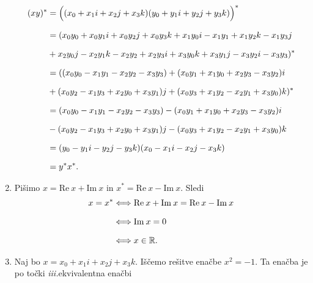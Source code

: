 \documentclass[mat1, tisk]{fmfdelo}
\numberwithin{equation}{section}
\begin{document}
\begin{dokaz}
\begin{enumerate}
        \begin{equation*}
        \setlength{\jot}{10pt}
            \begin{aligned}
                (xy)^{*} & = \Big((x_{0} + x_{1}i + x_{2}j + x_{3}k)(y_{0} + y_{1}i + y_{2}j + y_{3}k)\Big)^{*} \\
                & = (x_{0}y_{0} + x_{0}y_{1}i + x_{0}y_{2}j + x_{0}y_{3}k + x_{1}y_{0}i - x_{1}y_{1} + x_{1}y_{2}k - x_{1}y_{3}j \\
                &+ x_{2}y_{0}j - x_{2}y_{1}k - x_{2}y_{2} + x_{2}y_{3}i + x_{3}y_{0}k + x_{3}y_{1}j - x_{3}y_{2}i - x_{3}y_{3})^{*} \\
                &= ((x_{0}y_{0} - x_{1}y_{1} - x_{2}y_{2} - x_{3}y_{3}) + (x_{0}y_{1} + x_{1}y_{0} + x_{2}y_{3} - x_{3}y_{2})i \\
                &+ (x_{0}y_{2} - x_{1}y_{3} + x_{2}y_{0} + x_{3}y_{1})j + (x_{0}y_{3} + x_{1}y_{2} - x_{2}y_{1} + x_{3}y_{0})k)^{*} \\
                &= (x_{0}y_{0} - x_{1}y_{1} - x_{2}y_{2} - x_{3}y_{3}) - (x_{0}y_{1} + x_{1}y_{0} + x_{2}y_{3} - x_{3}y_{2})i \\
                &- (x_{0}y_{2} - x_{1}y_{3} + x_{2}y_{0} + x_{3}y_{1})j - (x_{0}y_{3} + x_{1}y_{2} - x_{2}y_{1} + x_{3}y_{0})k \\
                &= (y_{0} - y_{1}i - y_{2}j - y_{3}k)(x_{0} - x_{1}i - x_{2}j - x_{3}k) \\
                &= y^{*}x^{*}.
            \end{aligned}
        \end{equation*}
        \item Pišimo $x = \mathrm{Re} \: x + \mathrm{Im} \: x$ in ${x}^* = \mathrm{Re} \: x - \mathrm{Im} \: x$. Sledi
        \begin{equation*}
            \setlength{\jot}{10pt}
                \begin{aligned}
                    x = x^{*} &\Longleftrightarrow \mathrm{Re} \: x + \mathrm{Im} \: x = \mathrm{Re} \: x - \mathrm{Im} \: x \\
                    &\Longleftrightarrow \mathrm{Im} \: x = 0 \\
                    &\Longleftrightarrow x \in \mathbb{R}.
                \end{aligned}
        \end{equation*}
        \item Naj bo $x = x_{0} + x_{1}i + x_{2}j + x_{3}k$. Iščemo rešitve enačbe $x^2 = -1$. Ta enačba je po točki \textit{iii.}\@ ekvivalentna enačbi

\end{enumerate}
\end{dokaz}
\end{document}
